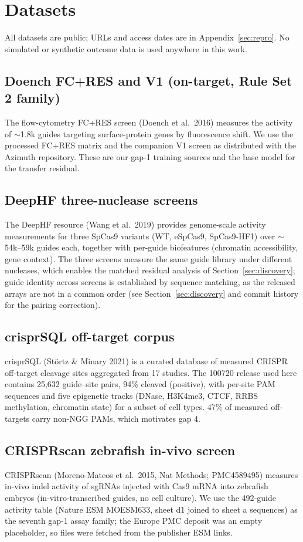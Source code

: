 \section{Datasets}
\label{sec:data}
All datasets are public; URLs and access dates are in
Appendix~\ref{sec:repro}. No simulated or synthetic outcome data is used anywhere in this work.

\subsection{Doench FC+RES and V1 (on-target, Rule Set 2 family)}
The flow-cytometry FC+RES screen (Doench et al.\ 2016) measures the
activity of ${\sim}$1.8k guides targeting surface-protein genes by
fluorescence shift. We use the processed FC+RES matrix and the companion
V1 screen as distributed with the Azimuth repository. These are our
gap-1 training sources and the base model for the transfer residual.

\subsection{DeepHF three-nuclease screens}
The DeepHF resource (Wang et al.\ 2019) provides genome-scale activity
measurements for three SpCas9 variants (WT, eSpCas9, SpCas9-HF1) over
${\sim}$54k--59k guides each, together with per-guide biofeatures
(chromatin accessibility, gene context). The three screens measure the
same guide library under different nucleases, which enables the matched
residual analysis of Section~\ref{sec:discovery}; guide identity across
screens is established by sequence matching, as the released arrays are
not in a common order (see Section~\ref{sec:discovery} and commit history
for the pairing correction).

\subsection{crisprSQL off-target corpus}
crisprSQL (St\"ortz \& Minary 2021) is a curated database of measured
CRISPR off-target cleavage sites aggregated from 17 studies. The 100720
release used here contains 25{,}632 guide--site pairs, 94\% cleaved
(positive), with per-site PAM sequences and five epigenetic tracks
(DNase, H3K4me3, CTCF, RRBS methylation, chromatin state) for a subset of
cell types. 47\% of measured off-targets carry non-NGG PAMs, which
motivates gap 4.

\subsection{CRISPRscan zebrafish in-vivo screen}
CRISPRscan (Moreno-Mateos et al.\ 2015, Nat Methods; PMC4589495) measures
in-vivo indel activity of sgRNAs injected with Cas9 mRNA into zebrafish
embryos (in-vitro-transcribed guides, no cell culture). We use the
492-guide activity table (Nature ESM MOESM633, sheet d1 joined to sheet a
sequences) as the seventh gap-1 assay family; the Europe PMC deposit was
an empty placeholder, so files were fetched from the publisher ESM links.

